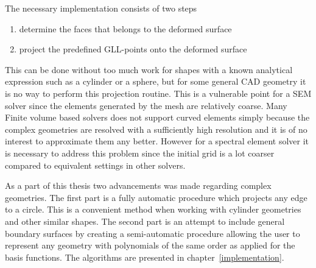 The necessary implementation consists of two steps 
%
\begin{enumerate}
    \item determine the faces that belongs to the deformed surface
    \item project the predefined GLL-points onto the deformed surface
\end{enumerate}
%
This can be done without too much work for shapes with a known analytical 
expression such as a cylinder or a sphere, but for some general CAD geometry 
it is no way to perform this projection routine. This is a vulnerable point 
for a SEM solver since the elements generated by the mesh are relatively coarse.
Many Finite volume based solvers does not support curved elements simply because the 
complex geometries are resolved with a sufficiently high resolution and it 
is of no interest to approximate them any better. However for a spectral element
solver it is necessary to address this problem since the initial grid is a lot coarser
compared to equivalent settings in other solvers.

As a part of this thesis two advancements was made regarding complex geometries. 
The first part is a fully automatic procedure which projects any edge to a circle. This is a
convenient method when working with cylinder geometries and other similar shapes. The second part
is an attempt to include general boundary surfaces by creating a semi-automatic procedure allowing 
the user to represent any geometry with polynomials of the same order as applied for the basis functions.
The algorithms are presented in chapter~\ref{implementation}. 
